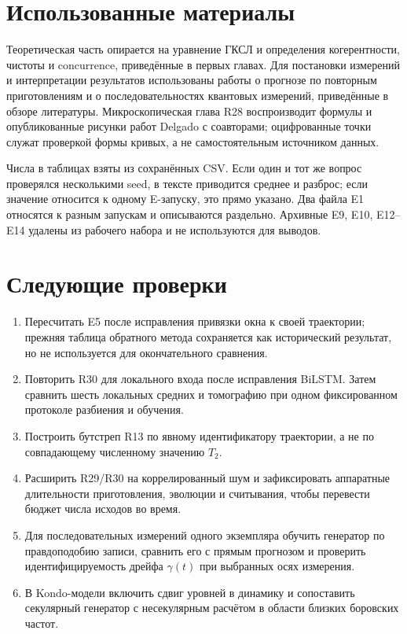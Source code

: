 \section{Использованные материалы}
Теоретическая часть опирается на уравнение ГКСЛ и определения когерентности,
чистоты и concurrence, приведённые в первых главах. Для постановки измерений
и интерпретации результатов использованы работы о прогнозе по повторным
приготовлениям и о последовательностях квантовых измерений, приведённые в
обзоре литературы. Микроскопическая глава R28 воспроизводит формулы и
опубликованные рисунки работ Delgado с соавторами; оцифрованные точки служат
проверкой формы кривых, а не самостоятельным источником данных.

Числа в таблицах взяты из сохранённых CSV. Если один и тот же вопрос
проверялся несколькими seed, в тексте приводится среднее и разброс; если
значение относится к одному E-запуску, это прямо указано. Два файла E1
относятся к разным запускам и описываются раздельно. Архивные E9, E10,
E12--E14 удалены из рабочего набора и не используются для выводов.

\section{Следующие проверки}
\begin{enumerate}
\item Пересчитать E5 после исправления привязки окна к своей траектории;
      прежняя таблица обратного метода сохраняется как исторический результат,
      но не используется для окончательного сравнения.
\item Повторить R30 для локального входа после исправления BiLSTM. Затем
      сравнить шесть локальных средних и томографию при одном фиксированном
      протоколе разбиения и обучения.
\item Построить бутстреп R13 по явному идентификатору траектории, а не по
      совпадающему численному значению $T_2$.
\item Расширить R29/R30 на коррелированный шум и зафиксировать аппаратные
      длительности приготовления, эволюции и считывания, чтобы перевести
      бюджет числа исходов во время.
\item Для последовательных измерений одного экземпляра обучить генератор
      по правдоподобию записи, сравнить его с прямым прогнозом и проверить
      идентифицируемость дрейфа $\gamma(t)$ при выбранных осях измерения.
\item В Kondo-модели включить сдвиг уровней в динамику и сопоставить
      секулярный генератор с несекулярным расчётом в области близких
      боровских частот.
\end{enumerate}
